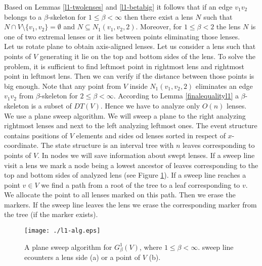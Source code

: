 \documentclass[11pt]{llncs}
\begin{document}
Based on Lemmas \ref{l1-twolenses} and \ref{l1-betabig} it follows that if an edge $v_1v_2$
belongs to a $\beta$-skeleton for $1 \leq \beta < \infty$ then there exist a lens $N$
such that $N \cap V \setminus \{v_1,v_2\} = \emptyset$ and $N \subseteq N_1(v_1,v_2,2)$.
Moreover, for $1 \leq \beta < 2$ the lens $N$ is one of two extremal lenses
or it lies between points eliminating those lenses. \\
Let us rotate plane to obtain axis-aligned lenses. Let us consider a lens such that points of $V$
generating it lie on the top and bottom sides of the lens. To solve the problem, it is sufficient 
to find leftmost point in rightmost lens and rightmost point in leftmost lens. Then we can verify
if the distance between those points is big enough. Note that any point from $V$ inside
$N_1(v_1,v_2,2)$ eliminates an edge $v_1v_2$ from $\beta$-skeleton for $2 \leq \beta < \infty$.
According to Lemma \ref{finalequalityl1} a $\beta$-skeleton is a subset of $DT(V)$.
Hence we have to analyze only $O(n)$ lenses. \\
We use a plane sweep algorithm. We will sweep a plane to the right analyzing rightmost lenses
and next to the left analyzing leftmost ones. The event structure contains positions of $V$ 
elements and sides od lenses sorted in respect of $x$-coordinate. The state structure is 
an interval tree with $n$ leaves corresponding to points of $V$. In nodes we will save 
information about swept lenses. If a sweep line visit a lens we mark a node being a lowest 
ancestor of leaves corresponding to the top and bottom sides of analyzed lens 
(see Figure \ref{fig:l1-alg}). 
If a sweep line reaches a point $v \in V$ we find a path from a root of the tree to a leaf 
corresponding to $v$. We allocate the point to all lenses marked on this path. Then we erase
the markers. If the sweep line leaves the lens we erase the corresponding marker from the tree
(if the marker exists).  

\begin{figure}[htbp]
\centering
\texttt{[image: ./l1-alg.eps]}
\caption{A plane sweep algorithm for $G_{\beta}^1(V)$, where $1 \leq \beta < \infty$.
sweep line ecounters a lens side (a) or a point of $V$ (b). }
\label{fig:l1-alg}
\end{figure}   
\end{document}
